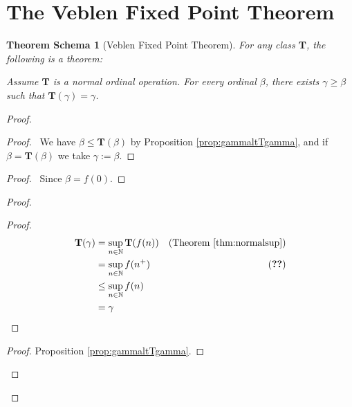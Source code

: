 \documentclass{book}
\let\qed\relax
\newtheorem{thms}[ax]{Theorem Schema}
\theoremstyle{definition}
\begin{document}
\section{The Veblen Fixed Point Theorem}

\begin{thms}[Veblen Fixed Point Theorem]
For any class $\mathbf{T}$, the following is a theorem:

Assume $\mathbf{T}$ is a normal ordinal operation. For every ordinal $\beta$, there exists $\gamma \geq \beta$ such that $\mathbf{T}(\gamma) = \gamma$.
\end{thms}

\begin{proof}
\pf
{}
\begin{proof}
	\pf\ We have $\beta \leq \mathbf{T}(\beta)$ by Proposition \ref{prop:gammaltTgamma}, and if $\beta = \mathbf{T}(\beta)$ we take $\gamma := \beta$.
\end{proof}
\begin{proof}
	\pf\ Since $\beta = f(0)$.
\end{proof}
\begin{proof}
	\begin{proof}
	\pf
	\begin{align*}
		\mathbf{T}(\gamma) & = \sup_{n \in \mathbb{N}} \mathbf{T}(f(n)) & (\text{Theorem \ref{thm:normalsup}}) \\
		& = \sup_{n \in \mathbb{N}} f(n^+) & (\text{\stepref{3}}) \\
		& \leq \sup_{n \in \mathbb{N}} f(n) \\
		& = \gamma
	\end{align*}
	\end{proof}
	\begin{proof}
		\pf Proposition \ref{prop:gammaltTgamma}.
	\end{proof}
\end{proof}
\qed
\end{proof}
\end{document}
